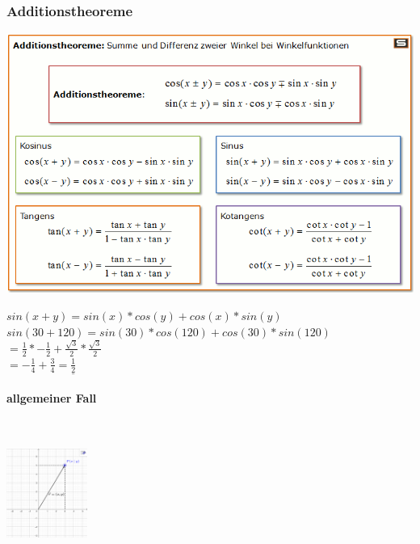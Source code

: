 \subsubsection{Additionstheoreme}
\begin{center}
    \includegraphics[width=1\textwidth]{MINT/Bilder/Additionstheoreme_Trigonometrie.png}
\end{center}
$sin(x+y)=sin(x)*cos(y)+cos(x)*sin(y)$\\
$sin(30+120)=sin(30)*cos(120)+cos(30)*sin(120)$\\
$=\frac12*-\frac12+\frac{\sqrt3}{2}*\frac{\sqrt3}{2}$\\
$=-\frac14+\frac34=\underline{\frac12}$
\paragraph*{allgemeiner Fall}~\\
\begin{center}
    \includegraphics[width=100px]{MINT/Bilder/download 1.png}
\end{center}
